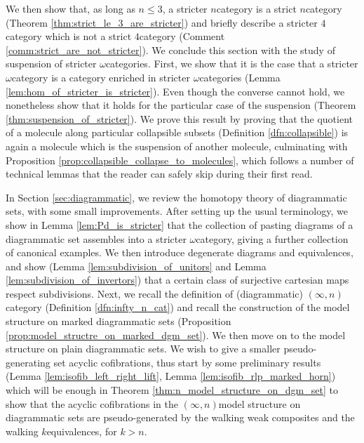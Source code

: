We then show that, as long as \( n \le 3 \), a stricter \( n \)\nbd category is a strict \( n \)\nbd category (Theorem \ref{thm:strict_le_3_are_stricter}) and briefly describe a stricter \( 4 \)\nbd category which is not a strict \( 4 \)\nbd category (Comment \ref{comm:strict_are_not_stricter}).
We conclude this section with the study of suspension of stricter \( \omega \)\nbd categories.
First, we show that it is the case that a stricter \( \omega \)\nbd category is a category enriched in stricter \( \omega \)\nbd categories (Lemma \ref{lem:hom_of_stricter_is_stricter}).
Even though the converse cannot hold, we nonetheless show that it holds for the particular case of the suspension (Theorem \ref{thm:suspension_of_stricter}).
We prove this result by proving that the quotient of a molecule along particular collapsible subsets (Definition \ref{dfn:collapsible}) is again a molecule which is the suspension of another molecule, culminating with Proposition \ref{prop:collapsible_collapse_to_molecules}, which follows a number of technical lemmas that the reader can safely skip during their first read.

In Section \ref{sec:diagrammatic}, we review the homotopy theory of diagrammatic sets, with some small improvements. 
After setting up the usual terminology, we show in Lemma \ref{lem:Pd_is_stricter} that the collection of pasting diagrams of a diagrammatic set assembles into a stricter \( \omega \)\nbd category, giving a further collection of canonical examples.
We then introduce degenerate diagrams and equivalences, and show (Lemma \ref{lem:subdivision_of_unitors} and Lemma \ref{lem:subdivision_of_invertors}) that a certain class of surjective cartesian maps respect subdivisions.
Next, we recall the definition of (diagrammatic) \( (\infty, n) \)\nbd category (Definition \ref{dfn:infty_n_cat}) and recall the construction of the model structure on marked diagrammatic sets (Proposition \ref{prop:model_structre_on_marked_dgm_set}).
We then move on to the model structure on plain diagrammatic sets. 
We wish to give a smaller pseudo-generating set acyclic cofibrations, thus start by some preliminary results (Lemma \ref{lem:isofib_left_right_lift}, Lemma \ref{lem:isofib_rlp_marked_horn}) which will be enough in Theorem \ref{thm:n_model_structure_on_dgm_set} to show that the acyclic cofibrations in the \( (\infty, n) \)\nbd model structure on diagrammatic sets are pseudo-generated by the walking weak composites and the walking \( k \)\nbd equivalences, for \( k > n \). 


